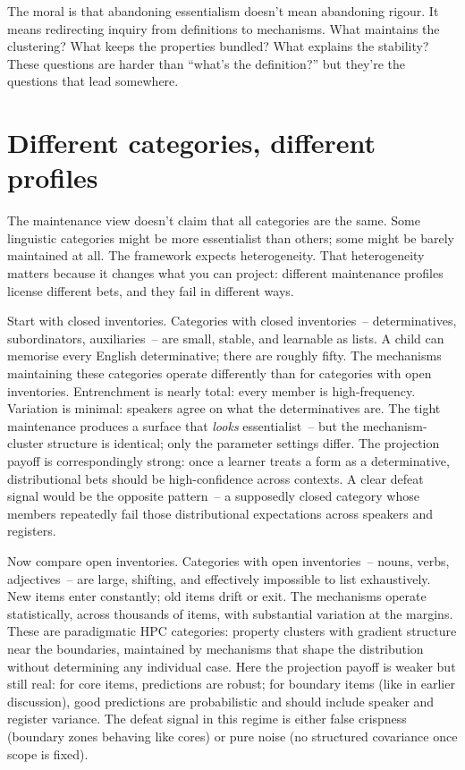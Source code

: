 The moral is that abandoning essentialism doesn't mean abandoning rigour. It means redirecting inquiry from definitions to mechanisms. What maintains the clustering? What keeps the properties bundled? What explains the stability? These questions are harder than \enquote{what's the definition?} but they're the questions that lead somewhere.


\section{Different categories, different profiles}
\label{sec:4:heterogeneity}

The maintenance view doesn't claim that all categories are the same. Some linguistic categories might be more essentialist than others; some might be barely maintained at all. The framework expects heterogeneity. That heterogeneity matters because it changes what you can project: different maintenance profiles license different bets, and they fail in different ways.

Start with closed inventories. Categories with closed inventories~-- determinatives, subordinators, auxiliaries~-- are small, stable, and learnable as lists. A child can memorise every English determinative; there are roughly fifty. The mechanisms maintaining these categories operate differently than for categories with open inventories. Entrenchment is nearly total: every member is high-frequency. Variation is minimal: speakers agree on what the determinatives are. The tight maintenance produces a surface that \emph{looks} essentialist~-- but the mechanism-cluster structure is identical; only the parameter settings differ. The projection payoff is correspondingly strong: once a learner treats a form as a determinative, distributional bets should be high-confidence across contexts. A clear defeat signal would be the opposite pattern~-- a supposedly closed category whose members repeatedly fail those distributional expectations across speakers and registers.

Now compare open inventories. Categories with open inventories~-- nouns, verbs, adjectives~-- are large, shifting, and effectively impossible to list exhaustively. New items enter constantly; old items drift or exit. The mechanisms operate statistically, across thousands of items, with substantial variation at the margins. These are paradigmatic HPC categories: property clusters with gradient structure near the boundaries, maintained by mechanisms that shape the distribution without determining any individual case. Here the projection payoff is weaker but still real: for core items, predictions are robust; for boundary items (like  in earlier discussion), good predictions are probabilistic and should include speaker and register variance. The defeat signal in this regime is either false crispness (boundary zones behaving like cores) or pure noise (no structured covariance once scope is fixed).


